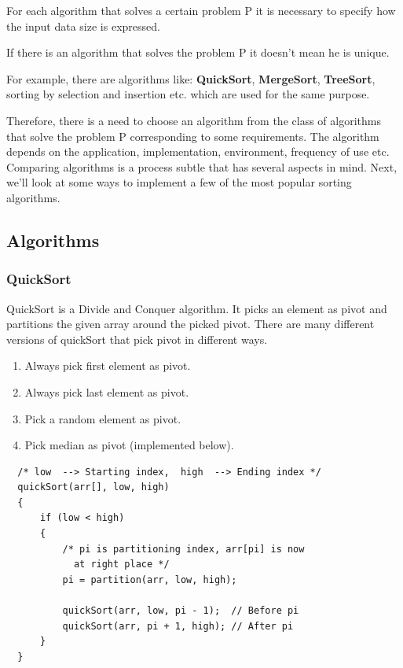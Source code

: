 \documentclass[a4paper, 12pt]{article}
\begin{document}
For each algorithm that solves a certain problem P
it is necessary to specify how the input data size is expressed.

If there is an algorithm that solves the problem P it doesn't mean he is unique.

For example, there are algorithms like: \textbf{QuickSort}, \textbf{MergeSort}, \textbf{TreeSort},
sorting by selection and insertion etc. which are used for the same purpose.

Therefore, there is a need to choose an algorithm from
the class of algorithms that solve the problem P corresponding to some
requirements. The algorithm depends on the application, implementation, environment,
frequency of use etc. Comparing algorithms is a process
subtle that has several aspects in mind. Next, we'll look at some ways to implement 
a few of the most popular sorting algorithms.

\newpage

\subsection{Algorithms}

\subsubsection{QuickSort}

QuickSort is a Divide and Conquer algorithm. It picks an element as pivot 
and partitions the given array around the picked pivot. There are many different 
versions of quickSort that pick pivot in different ways. 

\begin{enumerate}
  \item Always pick first element as pivot.
  \item Always pick last element as pivot.
  \item Pick a random element as pivot.
  \item Pick median as pivot (implemented below).
\end{enumerate}

\begin{lstlisting}
  /* low  --> Starting index,  high  --> Ending index */
  quickSort(arr[], low, high)
  {
      if (low < high)
      {
          /* pi is partitioning index, arr[pi] is now
            at right place */
          pi = partition(arr, low, high);

          quickSort(arr, low, pi - 1);  // Before pi
          quickSort(arr, pi + 1, high); // After pi
      }
  }
\end{lstlisting}
\end{document}
